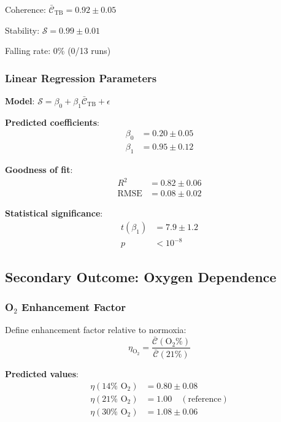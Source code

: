 \documentclass[11pt,onecolumn]{article}
\begin{document}
Coherence: $\bar{\mathcal{C}}_{\text{TB}} = 0.92 \pm 0.05$

Stability: $\mathcal{S} = 0.99 \pm 0.01$

Falling rate: 0\% (0/13 runs)

\subsubsection{Linear Regression Parameters}

\textbf{Model}: $\mathcal{S} = \beta_0 + \beta_1\bar{\mathcal{C}}_{\text{TB}} + \epsilon$

\textbf{Predicted coefficients}:
\begin{align}
\beta_0 &= 0.20 \pm 0.05 \\
\beta_1 &= 0.95 \pm 0.12
\end{align}

\textbf{Goodness of fit}:
\begin{align}
R^2 &= 0.82 \pm 0.06 \\
\text{RMSE} &= 0.08 \pm 0.02
\end{align}

\textbf{Statistical significance}:
\begin{align}
t(\beta_1) &= 7.9 \pm 1.2 \\
p &< 10^{-8}
\end{align}

\subsection{Secondary Outcome: Oxygen Dependence}

\subsubsection{O$_2$ Enhancement Factor}

Define enhancement factor relative to normoxia:
\begin{equation}
\eta_{\text{O}_2} = \frac{\bar{\mathcal{C}}(\text{O}_2\%)}{\bar{\mathcal{C}}(21\%)}
\end{equation}

\textbf{Predicted values}:
\begin{align}
\eta(14\% \text{ O}_2) &= 0.80 \pm 0.08 \\
\eta(21\% \text{ O}_2) &= 1.00 \quad (\text{reference}) \\
\eta(30\% \text{ O}_2) &= 1.08 \pm 0.06
\end{align}
\end{document}

